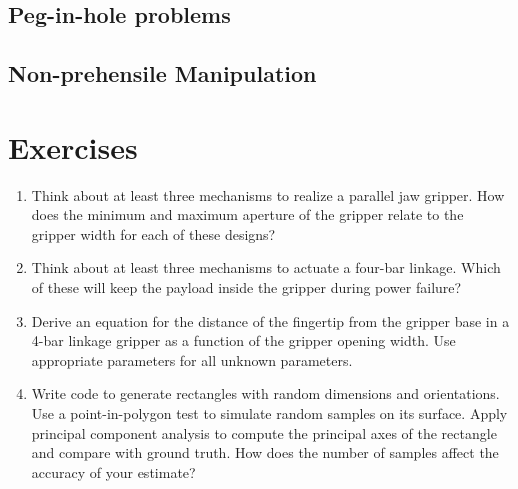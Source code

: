 \subsection{Peg-in-hole problems}
\subsection{Non-prehensile Manipulation}

\section{Exercises}
\begin{enumerate}
\item Think about at least three mechanisms to realize a parallel jaw gripper. How does the minimum and maximum aperture of the gripper relate to the gripper width for each of these designs?
\item Think about at least three mechanisms to actuate a four-bar linkage. Which of these will keep the payload inside the gripper during power failure?
\item Derive an equation for the distance of the fingertip from the gripper base in a 4-bar linkage gripper as a function of the gripper opening width. Use appropriate parameters for all unknown parameters. 
\item Write code to generate rectangles with random dimensions and orientations. Use a point-in-polygon test to simulate random samples on its surface. Apply principal component analysis to compute the principal axes of the rectangle and compare with ground truth. How does the number of samples affect the accuracy of your estimate?
\end{enumerate}
